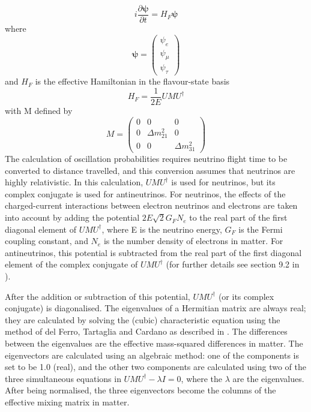 \begin{equation}
i \frac{\partial \mathbf{\psi}}{\partial t} = H_{F} \mathbf{\psi} 
\end{equation}
where
\begin{equation}
  \mathbf{\psi} =\left(
\begin{array}{c}
\psi_{e} \\
\psi_{\mu} \\
\psi_{\tau}
\end{array} \right)
\end{equation}
and $H_{F}$ is the effective Hamiltonian in the flavour-state basis
\begin{equation}
H_{F} = \frac{1}{2E} U M U^{\dagger}
\end{equation}
with M defined by
\begin{equation}
M = \left(
\begin{array}{ccc}
0 & 0 & 0 \\
0 & \Delta m_{21}^{2} & 0 \\
0 & 0 & \Delta m_{31}^{2}
\end{array} \right)
\end{equation}
The calculation of oscillation probabilities requires neutrino flight time to be converted to distance travelled, 
and this conversion assumes that neutrinos are highly relativistic. In 
this calculation, $U M U^{\dagger}$ is used for neutrinos, but its complex conjugate is used for antineutrinos. For neutrinos, 
the effects of the charged-current interactions between electron neutrinos and electrons are taken into account by adding the 
potential $2E \sqrt{2} G_{F} N_{e}$ to the real part of the first diagonal element of $U M U^{\dagger}$, where E is the 
neutrino energy, $G_{F}$ is the Fermi coupling constant, and $N_{e}$ is the number density of electrons in matter. For 
antineutrinos, this potential is subtracted from the real part of the first diagonal element of the complex conjugate of 
$U M U^{\dagger}$ (for further details see section 9.2 in \cite{giunti}). 

After the addition or subtraction of this potential, $U M U^{\dagger}$ (or its complex conjugate) is diagonalised. The eigenvalues 
of a Hermitian matrix are always real; they are calculated by solving the (cubic) characteristic equation using the method 
of del Ferro, Tartaglia and Cardano as described in \cite{kopp}. The differences between the eigenvalues are the effective 
mass-squared differences in matter. The eigenvectors are calculated using an algebraic method: one of the components is set 
to be 1.0 (real), and the other two components are calculated using two of the three simultaneous equations in 
$U M U^{\dagger} - \lambda I = 0$, where the $\lambda$ are the eigenvalues. After being normalised, the three eigenvectors 
become the columns of the effective mixing matrix in matter. 

